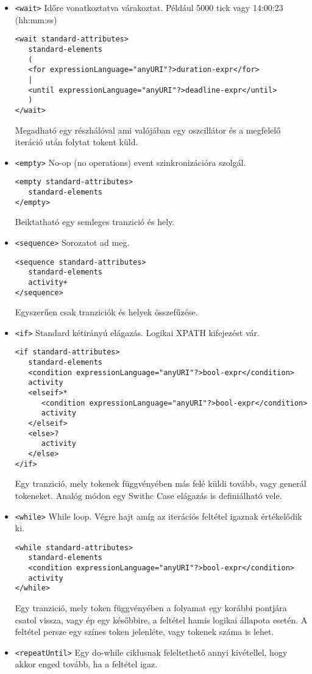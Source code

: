 \documentclass[12pt,a4paper]{book}
\begin{document}
\begin{itemize}
\item \texttt{<wait>} Időre vonatkoztatva várakoztat. Például 5000 tick vagy 14:00:23 (hh:mm:ss)
\begin{verbatim} 
<wait standard-attributes>
   standard-elements
   (
   <for expressionLanguage="anyURI"?>duration-expr</for>
   |
   <until expressionLanguage="anyURI"?>deadline-expr</until>
   )
</wait>
\end{verbatim}
Megadható egy részhálóval ami valójában egy oszcillátor és a megfelelő iteráció után folytat tokent küld. 
\item \texttt{<empty>} No-op (no operations) event szinkronizációra szolgál.
\begin{verbatim}
<empty standard-attributes>
   standard-elements
</empty>
\end{verbatim}
Beiktatható egy semleges tranzició és hely.
\item \texttt{<sequence>} Sorozatot ad meg.
\begin{verbatim}
<sequence standard-attributes>
   standard-elements
   activity+
</sequence>
\end{verbatim} Egyszerűen csak tranziciók és helyek összefűzése. 
\item \texttt{<if>} Standard kétirányú elágazás. Logikai XPATH kifejezést vár. 
\begin{verbatim}
<if standard-attributes>
   standard-elements
   <condition expressionLanguage="anyURI"?>bool-expr</condition>
   activity
   <elseif>*
      <condition expressionLanguage="anyURI"?>bool-expr</condition>
      activity
   </elseif>
   <else>?
      activity
   </else>
</if>
\end{verbatim}
Egy tranzició, mely tokenek függvényében más felé küldi tovább, vagy generál tokeneket. Analóg módon egy Swithc Case elágazás is definiálható vele.
\item \texttt{<while>} While loop. Végre hajt amíg az iterációs feltétel igaznak értékelődik ki. 
\begin{verbatim}
<while standard-attributes>
   standard-elements
   <condition expressionLanguage="anyURI"?>bool-expr</condition>
   activity
</while>
\end{verbatim}
Egy tranzició, mely token függvényében a folyamat egy korábbi pontjára csatol vissza, vagy ép egy későbbire, a feltétel hamis logikai állapota esetén. A feltétel persze egy színes token jelenléte, vagy tokenek száma is lehet. 
\item \texttt{<repeatUntil>} Egy do-while ciklusnak feleltethető annyi kivétellel, hogy akkor enged tovább, ha a feltétel igaz. 

\end{itemize}
\end{document}
